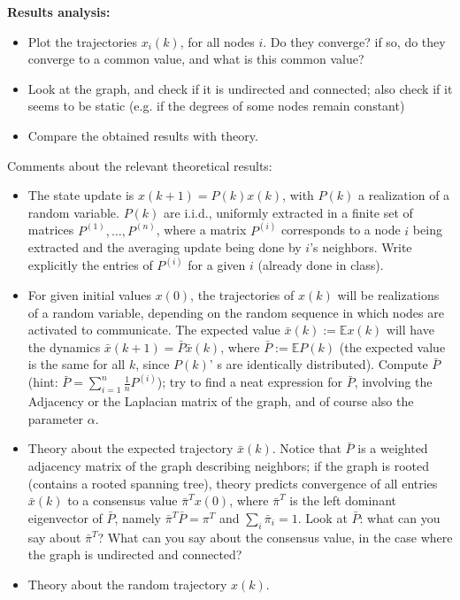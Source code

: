 \documentclass{article}
\begin{document}
\textbf{Results analysis:}
\begin{itemize}
\item Plot the trajectories $x_i(k)$, for all nodes $i$. Do they converge? if so, do they converge to a common value, and what is this common value?
\item Look at the graph, and check if it is undirected and connected; also check if it seems to be static (e.g. if the degrees of some nodes remain constant)
\item Compare the obtained results with theory.
\end{itemize}

Comments about the relevant theoretical results:
\begin{itemize}
\item
The state update is $x(k+1) = P(k) x(k)$, with $P(k)$ a realization of a random variable. $P(k)$ are i.i.d., uniformly extracted in a finite set of matrices $P^{(1)}, \dots, P^{(n)}$,  where a matrix $P^{(i)}$ corresponds to a node $i$ being extracted and the averaging update being done by $i$'s neighbors. Write explicitly the entries of $P^{(i)}$ for a given $i$ (already done in class).
\item
For given initial values $x(0)$, the trajectories of $x(k)$ will be realizations of a random variable, depending on the random sequence in which nodes are activated to communicate. The expected value $\bar x(k) := \mathbb E x(k)$ will have the dynamics $\bar x(k+1) = \bar P \bar x(k)$, where $\bar P := \mathbb E P(k)$ (the expected value is the same for all $k$, since $P(k)$' s are identically distributed).
Compute $\bar P$ (hint: $\bar P = \sum_{i=1}^n \frac{1}{n} P^{(i)}$);
try to find a neat expression for $\bar P$, involving the Adjacency or the Laplacian matrix of the graph, and of course also the parameter $\alpha$.
\item Theory about the expected trajectory $\bar x(k)$.
Notice that $\bar P$ is a weighted adjacency matrix of the graph describing neighbors; if the graph is rooted (contains a rooted spanning tree), theory predicts convergence of all entries $\bar x(k)$ to a consensus value $\bar \pi^T x(0)$, where  $\bar \pi^T$ is the left dominant eigenvector of $\bar P$, namely $\bar \pi^T \bar P = \pi^T$ and $\sum_i \bar \pi_i = 1$. Look at $\bar P$: what can you say about $\bar \pi^T$? What can you say about the consensus value, in the case where the graph is undirected and connected?
\item Theory about the random trajectory $x(k)$.
	\begin{itemize}

\end{itemize}
\end{itemize}
\end{document}
